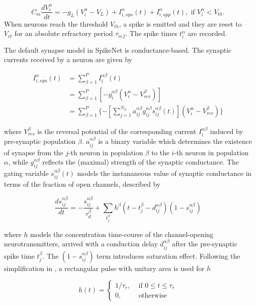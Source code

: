 \documentclass{article}
\begin{document}
\begin{equation}
C_{m}\frac{dV^{\alpha}_{i}}{dt} = -g_{L}(V^{\alpha}_{i}-V_{L}) + I^{\alpha}_{i,syn}(t) + I^{\alpha}_{i,app}(t), \text{ if } V^{\alpha}_{i} < V_{th}.
\end{equation}
When neurons reach the threshold $V_{th}$, a spike is emitted and they are reset to $V_{rt}$ for an absolute refractory period $\tau_{ref}$. 
The spike times $t^{\alpha}_{i}$ are recorded.

The default synapse model in SpikeNet is conductance-based. 
The synaptic currents received by a neuron are given by

\begin{align}
I^{\alpha}_{i,syn}(t) &= \sum_{\beta=1}^{P}I^{\alpha\beta}_{i}(t) \\
 &= \sum_{\beta=1}^{P}[-g_{i}^{\alpha\beta}(V^{\alpha}_{i}-V_{rev}^{\beta})] \\
 &= \sum_{\beta=1}^{P}\{-[\sum_{j=1}^{N_{\beta}}a_{ij}^{\alpha\beta}g_{ij}^{\alpha\beta}s_{ij}^{\alpha\beta}(t)](V^{\alpha}_{i}-V_{rev}^{\beta})\}\label{eq:I_syn}
\end{align}


\noindent
where $V_{rev}^{\beta}$ is the reversal potential of the corresponding current $I^{\alpha\beta}_{i}$ induced by pre-synaptic population $\beta$. 
$a_{ij}^{\alpha\beta}$ is a binary variable which determines the existence of synapse from the $j$-th neuron in population $\beta$ to the $i$-th neuron in  population $\alpha$, while $g_{ij}^{\alpha\beta}$ reflects the (maximal) strength of the synaptic conductance. 
The gating variable $s_{ij}^{\alpha\beta}(t)$ models the instananeous value of synaptic conductance in terms of the fraction of open channels, described by

\begin{equation}
\frac{ds_{ij}^{\alpha\beta}}{dt} = -\frac{s_{ij}^{\alpha\beta}}{\tau_{d}^{\beta}}+\sum_{t^{\beta}_{j}}h^{\beta}(t-t^{\beta}_{j}-d^{\alpha\beta}_{ij})(1-s_{ij}^{\alpha\beta})
\label{eq:gating}
\end{equation}

\noindent
where $h$ models the concentration time-course of the channel-opening neurotransmitters, arrived with a conduction delay $d^{\alpha\beta}_{ij}$ after the pre-synaptic spike time $t^{\beta}_{j}$. 
The $(1-s_{ij}^{\alpha\beta})$ term introduces saturation effect. 
Following the simplification in \cite{destexhe1994efficient}, a rectangular pulse with unitary area is used for $h$

\begin{equation}
h(t) = 
\begin{cases}
1/\tau_{r},& \text{ if } 0\leq t \leq \tau_{r}\\
0,& \text{ otherwise}
\end{cases}
\end{equation}
\end{document}
